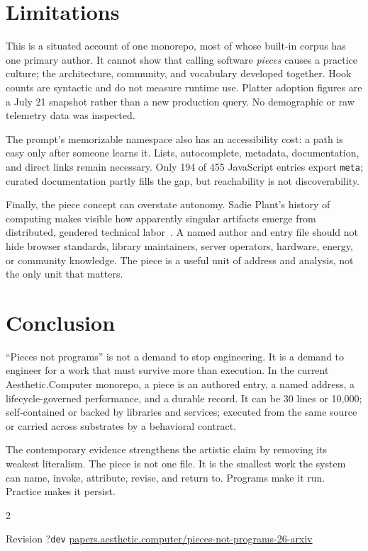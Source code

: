 \documentclass[10pt,letterpaper,twocolumn]{article}
\newcommand{\acdot}{{\color{acpink}.}}
\newcommand{\ac}{Aesthetic{\acdot}Computer}
\newcommand{\code}[1]{\texttt{#1}}
\providecommand{\paperhash}{dev}\providecommand{\paperrev}{?}}
\begin{document}
\section{Limitations}

This is a situated account of one monorepo, most of whose built-in corpus has one primary author. It cannot show that calling software \emph{pieces} causes a practice culture; the architecture, community, and vocabulary developed together. Hook counts are syntactic and do not measure runtime use. Platter adoption figures are a July 21 snapshot rather than a new production query. No demographic or raw telemetry data was inspected.

The prompt's memorizable namespace also has an accessibility cost: a path is easy only after someone learns it. Lists, autocomplete, metadata, documentation, and direct links remain necessary. Only 194 of 455 JavaScript entries export \code{meta}; curated documentation partly fills the gap, but reachability is not discoverability.

Finally, the piece concept can overstate autonomy. Sadie Plant's history of computing makes visible how apparently singular artifacts emerge from distributed, gendered technical labor~\citep{plant1997zeros}. A named author and entry file should not hide browser standards, library maintainers, server operators, hardware, energy, or community knowledge. The piece is a useful unit of address and analysis, not the only unit that matters.

\section{Conclusion}

``Pieces not programs'' is not a demand to stop engineering. It is a demand to engineer for a work that must survive more than execution. In the current \ac{} monorepo, a piece is an authored entry, a named address, a lifecycle-governed performance, and a durable record. It can be 30 lines or 10,000; self-contained or backed by libraries and services; executed from the same source or carried across substrates by a behavioral contract.

The contemporary evidence strengthens the artistic claim by removing its weakest literalism. The piece is not one file. It is the smallest work the system can name, invoke, attribute, revise, and return to. Programs make it run. Practice makes it persist.


\setlength{\bibsep}{1.2pt plus 0.2ex}
\onecolumn
\begin{multicols}{2}
{\footnotesize

}
\end{multicols}

\vspace{0.8em}
\begin{center}
\footnotesize\sffamily\color{acgray}
Revision \paperrev\;\textperiodcentered\;\texttt{\paperhash}\;\textperiodcentered\;
\href{https://papers.aesthetic.computer/pieces-not-programs-26-arxiv.pdf}{papers.aesthetic.computer/pieces-not-programs-26-arxiv}
\end{center}
\end{document}
